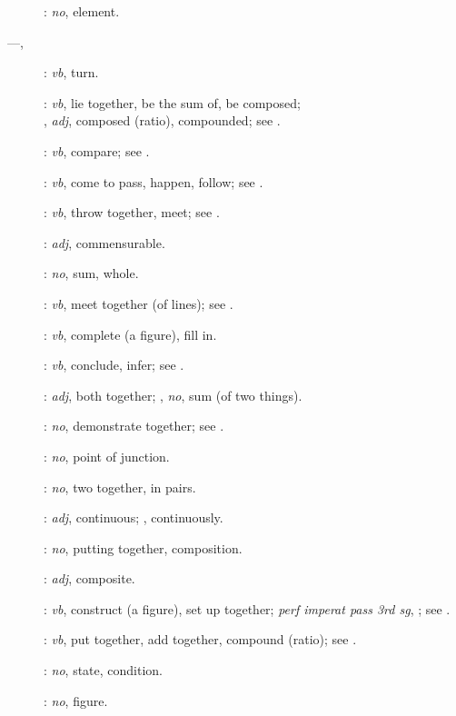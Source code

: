 {\begin{description}
\item[]: {\em no}, element.
\item[ ---, ]:
{\em vb}, turn.
\item[]: {\em vb}, lie together, be the sum of, be composed;\\ , {\em adj}, composed (ratio), compounded; see .
\item[]: {\em vb}, compare; see .
\item[]: {\em vb}, come to pass, happen, follow; see
.
\item[]: {\em vb}, throw together, meet; see .
\item[]: {\em adj}, commensurable.
\item[]: {\em no}, sum, whole.
\item[]: {\em vb}, meet together (of lines); see .
\item[]: {\em vb}, complete (a figure), fill in.
\item[]: {\em vb}, conclude, infer; see .
\item[]: {\em adj}, both together;
, {\em no}, sum (of two things).
\item[]: {\em no}, demonstrate together; see .
\item[]: {\em no}, point of junction.
\item[]: {\em no}, two together, in pairs.
\item[]: {\em adj}, continuous; , 
continuously.
\item[]: {\em no}, putting together, composition.
\item[]: {\em adj}, composite.
\item[]: {\em vb}, construct (a figure), set up together;  {\em perf imperat pass 3rd sg}, ; see .
\item[]: {\em vb}, put together, add together, compound (ratio); see .
\item[]: {\em no}, state, condition.
\item[]: {\em no}, figure.

\end{description}}
